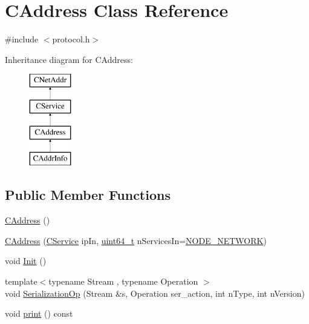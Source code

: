 \hypertarget{class_c_address}{}\section{C\+Address Class Reference}
\label{class_c_address}


{\ttfamily \#include $<$protocol.\+h$>$}

Inheritance diagram for C\+Address\+:\begin{figure}[H]
\begin{center}
\leavevmode
\includegraphics[height=4.000000cm]{class_c_address}
\end{center}
\end{figure}
\subsection*{Public Member Functions}
\begin{DoxyCompactItemize}
\item 
\hyperlink{class_c_address_a84cd336180580ab69b8888a4339ccc37}{C\+Address} ()
\item 
\hyperlink{class_c_address_a806e75f363ec49bfab92a686a8774ac3}{C\+Address} (\hyperlink{class_c_service}{C\+Service} ip\+In, \hyperlink{stdint_8h_aaa5d1cd013383c889537491c3cfd9aad}{uint64\+\_\+t} n\+Services\+In=\hyperlink{protocol_8h_abc5c98fcc1211af2b80116dd6e0a035da9d1154f0e7e56f183a5c8373abe2e86c}{N\+O\+D\+E\+\_\+\+N\+E\+T\+W\+O\+R\+K})
\item 
void \hyperlink{class_c_address_ac060c84dcf47b8ccfae0142c9b29a243}{Init} ()
\item 
{\footnotesize template$<$typename Stream , typename Operation $>$ }\\void \hyperlink{class_c_address_aec10c7075404eefbcf6f7a4c5671be02}{Serialization\+Op} (Stream \&s, Operation ser\+\_\+action, int n\+Type, int n\+Version)
\item 
void \hyperlink{class_c_address_a0554ba38d96380c57bc193fa416cee65}{print} () const 
\end{DoxyCompactItemize}
